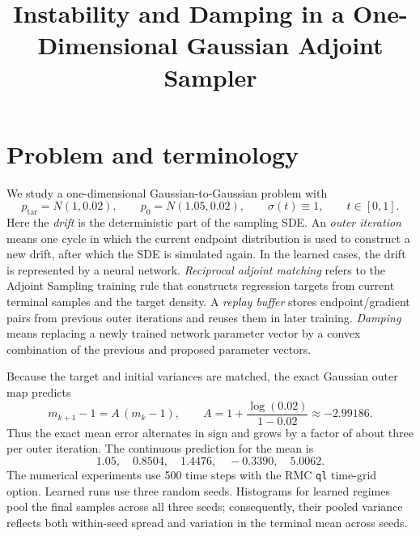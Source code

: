 \documentclass[10pt]{article}
\title{Instability and Damping in a One-Dimensional Gaussian Adjoint Sampler}
\author{}
\date{}
\begin{document}
\maketitle
\vspace{-1.4em}

\section{Problem and terminology}

We study a one-dimensional Gaussian-to-Gaussian problem with
\[
    p_{\mathrm{tar}} = N(1,0.02),
    \qquad
    p_0 = N(1.05,0.02),
    \qquad
    \sigma(t) \equiv 1,
    \qquad t\in[0,1].
\]
Here the \emph{drift} is the deterministic part of the sampling SDE. An \emph{outer iteration} means one cycle in which the current endpoint distribution is used to construct a new drift, after which the SDE is simulated again. In the learned cases, the drift is represented by a neural network. \emph{Reciprocal adjoint matching} refers to the Adjoint Sampling training rule that constructs regression targets from current terminal samples and the target density. A \emph{replay buffer} stores endpoint/gradient pairs from previous outer iterations and reuses them in later training. \emph{Damping} means replacing a newly trained network parameter vector by a convex combination of the previous and proposed parameter vectors.

Because the target and initial variances are matched, the exact Gaussian outer map predicts
\[
    m_{k+1}-1 = A\,(m_k-1),
    \qquad
    A = 1 + \frac{\log(0.02)}{1-0.02}
      \approx -2.99186.
\]
Thus the exact mean error alternates in sign and grows by a factor of about three per outer iteration. The continuous prediction for the mean is
\[
1.05,\quad 0.8504,\quad 1.4476,\quad -0.3390,\quad 5.0062.
\]
The numerical experiments use 500 time steps with the RMC \texttt{ql} time-grid option. Learned runs use three random seeds. Histograms for learned regimes pool the final samples across all three seeds; consequently, their pooled variance reflects both within-seed spread and variation in the terminal mean across seeds.
\end{document}
